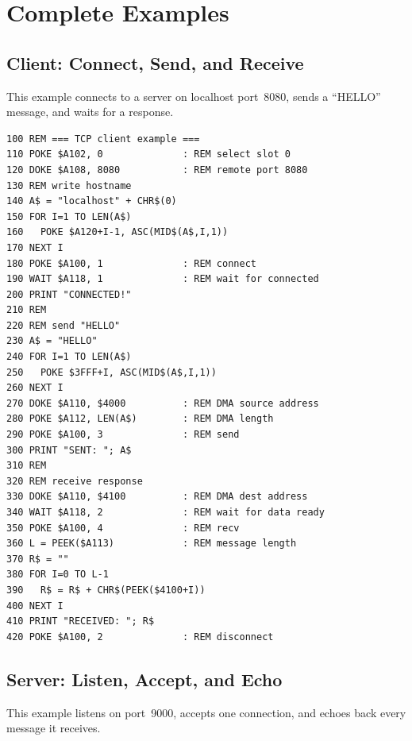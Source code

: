 \section{Complete Examples}
\label{sec:nic-examples}

\subsection{Client: Connect, Send, and Receive}

This example connects to a server on localhost port~8080, sends a
``HELLO'' message, and waits for a response.

\begin{lstlisting}
100 REM === TCP client example ===
110 POKE $A102, 0              : REM select slot 0
120 DOKE $A108, 8080           : REM remote port 8080
130 REM write hostname
140 A$ = "localhost" + CHR$(0)
150 FOR I=1 TO LEN(A$)
160   POKE $A120+I-1, ASC(MID$(A$,I,1))
170 NEXT I
180 POKE $A100, 1              : REM connect
190 WAIT $A118, 1              : REM wait for connected
200 PRINT "CONNECTED!"
210 REM
220 REM send "HELLO"
230 A$ = "HELLO"
240 FOR I=1 TO LEN(A$)
250   POKE $3FFF+I, ASC(MID$(A$,I,1))
260 NEXT I
270 DOKE $A110, $4000          : REM DMA source address
280 POKE $A112, LEN(A$)        : REM DMA length
290 POKE $A100, 3              : REM send
300 PRINT "SENT: "; A$
310 REM
320 REM receive response
330 DOKE $A110, $4100          : REM DMA dest address
340 WAIT $A118, 2              : REM wait for data ready
350 POKE $A100, 4              : REM recv
360 L = PEEK($A113)            : REM message length
370 R$ = ""
380 FOR I=0 TO L-1
390   R$ = R$ + CHR$(PEEK($4100+I))
400 NEXT I
410 PRINT "RECEIVED: "; R$
420 POKE $A100, 2              : REM disconnect
\end{lstlisting}

\subsection{Server: Listen, Accept, and Echo}

This example listens on port~9000, accepts one connection, and echoes back
every message it receives.

